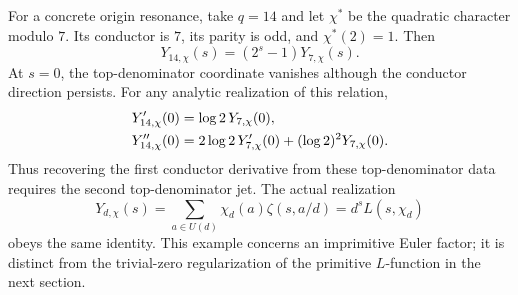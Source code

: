 For a concrete origin resonance, take \(q=14\) and let \(\chi^*\)
be the quadratic character modulo \(7\). Its conductor is \(7\),
its parity is odd, and \(\chi^*(2)=1\). Then
\begin{equation}
 Y_{14,\chi}(s)=(2^s-1)Y_{7,\chi}(s).
 \label{eq:dist-resonance-example}
\end{equation}
At \(s=0\), the top-denominator coordinate vanishes although the
conductor direction persists. For any analytic realization of
this relation,
\begin{align}
 Y_{14,\chi}'(0)&=\log2\,Y_{7,\chi}(0),\notag\\
 Y_{14,\chi}''(0)&=
 2\log2\,Y_{7,\chi}'(0)+(\log2)^2Y_{7,\chi}(0).
 \label{eq:dist-resonance-example-jets}
\end{align}
Thus recovering the first conductor derivative from these
top-denominator data requires the second top-denominator jet.
The actual realization
\[
 Y_{d,\chi}(s)
 =\sum_{a\in U(d)}\chi_d(a)\zeta(s,a/d)
 =d^sL(s,\chi_d)
\]
obeys the same identity. This example concerns an imprimitive
Euler factor; it is distinct from the trivial-zero regularization
of the primitive \(L\)-function in the next section.
